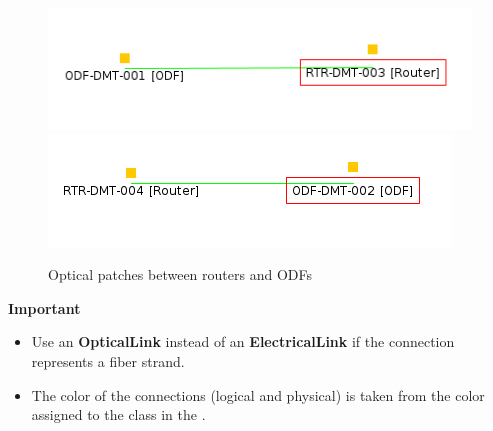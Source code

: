 \documentclass[a4paper]{article}
\begin{document}
\begin{enumerate}
\begin{figure}[h!]
						\centering
						\includegraphics[width=0.5\linewidth]{img/l1_example_2_patch_a.png}\\
						\includegraphics[width=0.5\linewidth]{img/l1_example_2_patch_b.png}
						\caption{Optical patches between routers and ODFs}
						\label{fig:l1_example_2_patches}
					\end{figure}
					\begin{framed} {\large \textbf{Important}}\\
						\begin{itemize}
							\item 							Use an \textbf{OpticalLink} instead of an \textbf{ElectricalLink} if the connection represents a fiber strand.
							\item The color of the connections (logical and physical) is taken from the color assigned to the class in the .
						\end{itemize}
						

\end{framed}
\end{enumerate}
\end{document}
